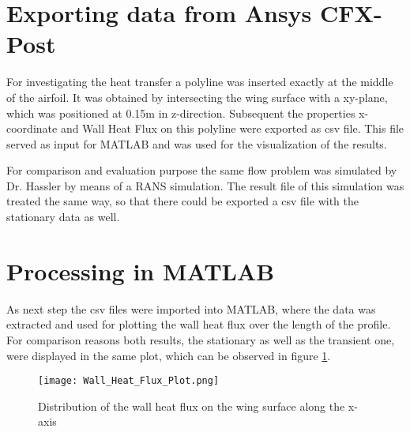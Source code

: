 \section{Exporting data from Ansys CFX-Post}
For investigating the heat transfer a polyline was inserted exactly at the middle of the airfoil. It was obtained by intersecting the wing surface with a xy-plane, which was positioned at 0.15m in z-direction. 
Subsequent the properties x-coordinate and Wall Heat Flux on this polyline were exported as csv file. This file served as input for MATLAB\textsuperscript{\textregistered} and was used for the visualization of the results.

For comparison and evaluation purpose the same flow problem was simulated by Dr. Hassler by means of a RANS simulation. The result file of this simulation was treated the same way, so that there could be exported a csv file with the stationary data as well.

\section{Processing in MATLAB\textsuperscript{\textregistered}}
As next step the csv files were imported into MATLAB\textsuperscript{\textregistered}, where the data was extracted and used for plotting the wall heat flux over the length of the profile. For comparison reasons both results, the stationary as well as the transient one, were displayed in the same plot, which can be observed in figure \ref{fig:whf_plot}.

\begin{figure}[ht]
\centering
\texttt{[image: Wall\_Heat\_Flux\_Plot.png]}
\caption{Distribution of the wall heat flux on the wing surface along the x-axis}
\label{fig:whf_plot}
\end{figure}

